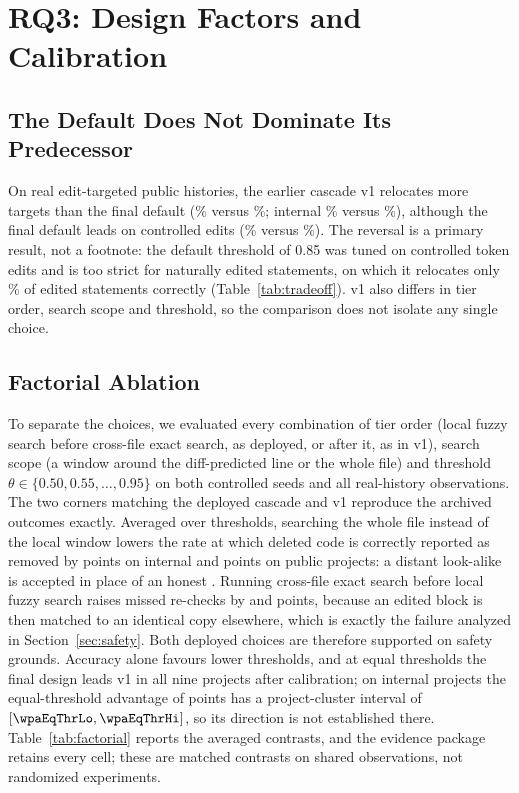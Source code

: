 \section{RQ3: Design Factors and Calibration}\label{sec:design-results}

\subsection{The Default Does Not Dominate Its Predecessor}
On real edit-targeted public histories, the earlier cascade v1 relocates more targets than the final default (\smPubTgtVoneAccPct\% versus \smPubTgtCasAccPct\%; internal \smIntTgtVoneAccPct\% versus \smIntTgtCasAccPct\%), although the final default leads on controlled edits (\smCtlCasAccPct\% versus \smCtlVoneAccPct\%). The reversal is a primary result, not a footnote: the default threshold of 0.85 was tuned on controlled token edits and is too strict for naturally edited statements, on which it relocates only \thetaEditedEightyFive\% of edited statements correctly (Table~\ref{tab:tradeoff}). v1 also differs in tier order, search scope and threshold, so the comparison does not isolate any single choice.

\subsection{Factorial Ablation}
To separate the choices, we evaluated every combination of tier order (local fuzzy search before cross-file exact search, as deployed, or after it, as in v1), search scope (a window around the diff-predicted line or the whole file) and threshold $\theta\in\{0.50,0.55,\dots,0.95\}$ on both controlled seeds and all real-history observations. The two corners matching the deployed cascade and v1 reproduce the archived outcomes exactly. Averaged over thresholds, searching the whole file instead of the local window lowers the rate at which deleted code is correctly reported as removed by \wpaScopeGoneInt{} points on internal and \wpaScopeGonePub{} points on public projects: a distant look-alike is accepted in place of an honest . Running cross-file exact search before local fuzzy search raises missed re-checks by \wpaOrderMissInt{} and \wpaOrderMissPub{} points, because an edited block is then matched to an identical copy elsewhere, which is exactly the failure analyzed in Section~\ref{sec:safety}. Both deployed choices are therefore supported on safety grounds. Accuracy alone favours lower thresholds, and at equal thresholds the final design leads v1 in all nine projects after calibration; on internal projects the equal-threshold advantage of \wpaEqThrDiff{} points has a project-cluster interval of $[\wpaEqThrLo, \wpaEqThrHi]$, so its direction is not established there. Table~\ref{tab:factorial} reports the averaged contrasts, and the evidence package retains every cell; these are matched contrasts on shared observations, not randomized experiments.

